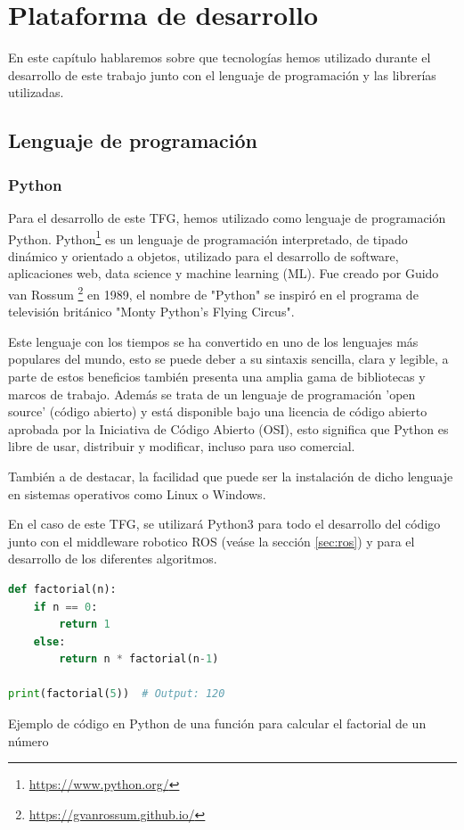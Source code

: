 \chapter{Plataforma de desarrollo}
\label{cap:capitulo3}

En este capítulo hablaremos sobre que tecnologías hemos utilizado durante el desarrollo de este trabajo junto con el lenguaje de programación y las librerías utilizadas.
\section{Lenguaje de programación}
\label{sec:programación}
\subsection{Python}
\label{sec:python}
Para el desarrollo de este TFG, hemos utilizado como lenguaje de programación Python. Python\footnote{\url{https://www.python.org/}} es un lenguaje de programación interpretado, de tipado dinámico y orientado a objetos,
utilizado para el desarrollo de software, aplicaciones web, data science y machine learning (ML).  
Fue creado por Guido van Rossum \footnote{\url{https://gvanrossum.github.io/}} en 1989, el nombre de "Python" se inspiró en el programa de televisión británico "Monty Python's Flying Circus". \newline

Este lenguaje con los tiempos se ha convertido en uno de los lenguajes más populares del mundo, esto se puede deber a su sintaxis sencilla, clara y legible, a parte 
de estos beneficios también presenta una amplia gama de bibliotecas y marcos de trabajo. Además se trata de un lenguaje de programación 'open source' (código abierto) y está disponible bajo
una licencia de código abierto aprobada por la Iniciativa de Código Abierto (OSI), esto significa que Python es libre de usar, distribuir y modificar, incluso para uso
comercial. \newline

También a de destacar, la facilidad que puede ser la instalación de dicho lenguaje en sistemas operativos como Linux o Windows. \newline

En el caso de este TFG, se utilizará Python3 para todo el desarrollo del código junto con el middleware robotico ROS (veáse la sección \ref{sec:ros}) y para el desarrollo
de los diferentes algoritmos. 
\newline

\begin{code}[h]
\begin{lstlisting}[language=Python]
  def factorial(n):
    if n == 0:
        return 1
    else:
        return n * factorial(n-1)

print(factorial(5))  # Output: 120

\end{lstlisting}
\caption[Ejemplo de código en Python de una función para calcular el factorial de un número]{Ejemplo de código en Python de una función para calcular el factorial de un número}
\label{cod:codejemplo}
\end{code}  
